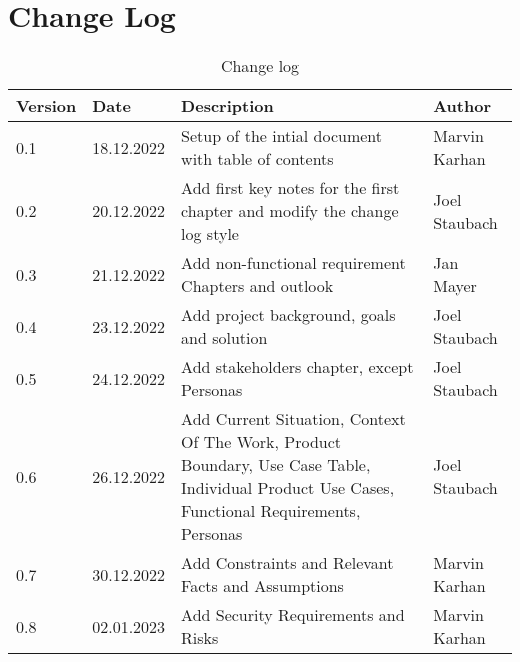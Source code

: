 \chapter{Change Log}

\sffamily
\begin{footnotesize}
  \renewcommand{\arraystretch}{1.4}
  \begin{longtable}[L L L L]{ p{} p{} p{} p{} }
    \caption                       %
        {Change log} %
        \\
    \toprule
    \textbf{Version} & \textbf{Date} & \textbf{Description} & \textbf{Author}\\
    \midrule
    0.1              & 18.12.2022    & Setup of the intial document with table of contents                                  & Marvin Karhan   \\
    
    0.2              & 20.12.2022    & Add first key notes for the first chapter and modify the change log style            & Joel Staubach   \\
    
    0.3              & 21.12.2022    & Add non-functional requirement Chapters and outlook                                  & Jan Mayer       \\
    
    0.4              & 23.12.2022    & Add project background, goals and solution                                           & Joel Staubach   \\
    
    0.5              & 24.12.2022    & Add stakeholders chapter, except Personas                                            & Joel Staubach   \\
    
    0.6              & 26.12.2022    & Add Current Situation, Context Of The Work, Product Boundary, Use Case Table, Individual Product Use Cases, Functional Requirements, Personas                                                              & Joel Staubach   \\
    
    0.7              & 30.12.2022    & Add Constraints and Relevant Facts and Assumptions                                   & Marvin Karhan   \\
    
    0.8              & 02.01.2023    & Add Security Requirements and Risks                                                  & Marvin Karhan   \\
    

\end{longtable}
\end{footnotesize}
